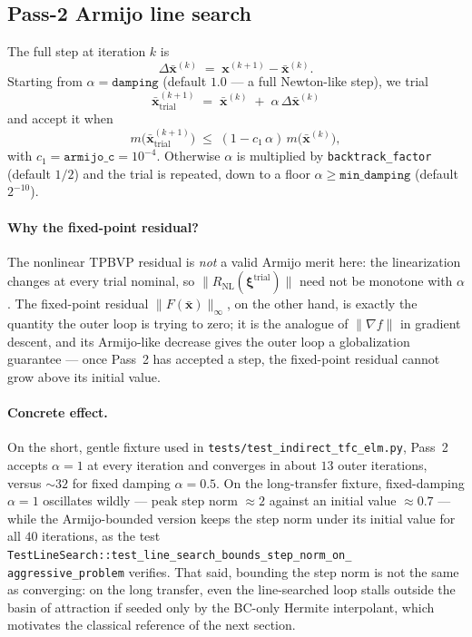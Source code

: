 \documentclass[8pt,a4paper]{article}
\newcommand{\bvec}[1]{\bm{#1}}
\newcommand{\xvec}{\bvec{x}}
\theoremstyle{definition}
\theoremstyle{remark}
\begin{document}
\subsection{Pass-2 Armijo line search}
\label{sec:armijo}

The full step at iteration $k$ is
\[
  \Delta \bar{\xvec}^{(k)} \;=\; \xvec^{(k+1)} - \bar{\xvec}^{(k)}.
\]
Starting from $\alpha = \texttt{damping}$ (default $1.0$ --- a full
Newton-like step), we trial
\[
  \bar{\xvec}^{(k+1)}_{\mathrm{trial}} \;=\; \bar{\xvec}^{(k)}
     \;+\; \alpha \, \Delta \bar{\xvec}^{(k)}
\]
and accept it when
\begin{equation}
  m\big(\bar{\xvec}^{(k+1)}_{\mathrm{trial}}\big)
  \;\leq\;
  (1 - c_1\,\alpha)\, m\big(\bar{\xvec}^{(k)}\big),
\label{eq:armijo}
\end{equation}
with $c_1 = \texttt{armijo\_c} = 10^{-4}$. Otherwise $\alpha$ is
multiplied by \texttt{backtrack\_factor} (default $1/2$) and the
trial is repeated, down to a floor $\alpha \geq \texttt{min\_damping}$
(default $2^{-10}$).

\paragraph{Why the fixed-point residual?}
The nonlinear TPBVP residual is \emph{not} a valid Armijo merit
here: the linearization changes at every trial nominal, so
$\|R_{\mathrm{NL}}(\bm\xi^{\mathrm{trial}})\|$ need not be monotone
with $\alpha$. The fixed-point residual
$\|F(\bar{\xvec})\|_\infty$, on the other hand, is exactly the
quantity the outer loop is trying to zero; it is the analogue of
$\|\nabla\!f\|$ in gradient descent, and its Armijo-like decrease
gives the outer loop a globalization guarantee --- once Pass~2 has
accepted a step, the fixed-point residual cannot grow above its
initial value.

\paragraph{Concrete effect.}
On the short, gentle fixture used in
\texttt{tests/test\_indirect\_tfc\_elm.py}, Pass~2 accepts
$\alpha = 1$ at every iteration and converges in about $13$ outer
iterations, versus $\sim\! 32$ for fixed damping $\alpha = 0.5$. On
the long-transfer fixture, fixed-damping $\alpha = 1$ oscillates
wildly --- peak step norm $\approx 2$ against an initial value
$\approx 0.7$ --- while the Armijo-bounded version keeps the step
norm under its initial value for all $40$ iterations, as the test
\texttt{TestLineSearch::test\_line\_search\_bounds\_step\_norm\_on\_%
aggressive\_problem} verifies. That said, bounding the step norm is
not the same as converging: on the long transfer, even the
line-searched loop stalls outside the basin of attraction if seeded
only by the BC-only Hermite interpolant, which motivates the
classical reference of the next section.
\end{document}
